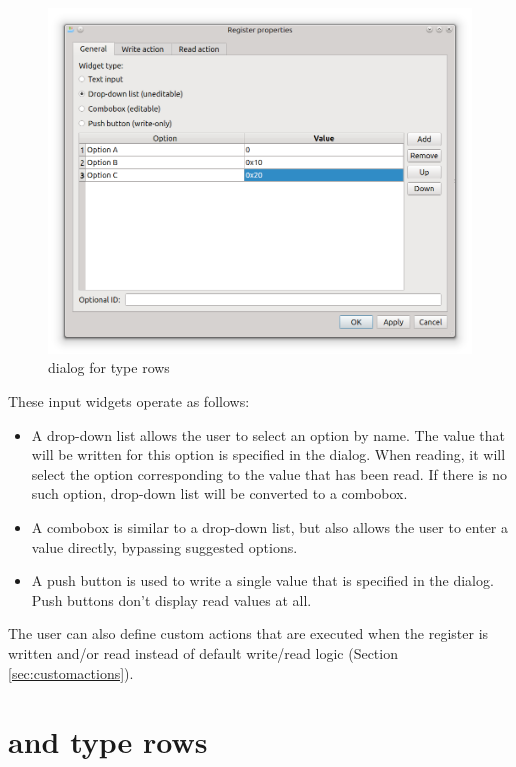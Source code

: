 \documentclass[a4paper,12pt,twoside,extrafontsizes]{memoir}
\begin{document}
\begin{figure}[htbp]
\centering
\includegraphics[scale=0.7]{images/registermapreg.png}
\caption{ dialog for  type rows}
\label{fig:registermapreg}
\end{figure}

These input widgets operate as follows:

\begin{itemize}
	\item A drop-down list allows the user to select an option by name. The value that will be written for this option is specified in the  dialog. When reading, it will select the option corresponding to the value that has been read. If there is no such option, drop-down list will be converted to a combobox.
	\item A combobox is similar to a drop-down list, but also allows the user to enter a value directly, bypassing suggested options.
	\item A push button is used to write a single value that is specified in the  dialog. Push buttons don't display read values at all.
\end{itemize}

The user can also define custom actions that are executed when the register is written and/or read instead of default write/read logic (Section \ref{sec:customactions}).

\section[FIFO and Memory type rows]{ and  type rows}
\end{document}
